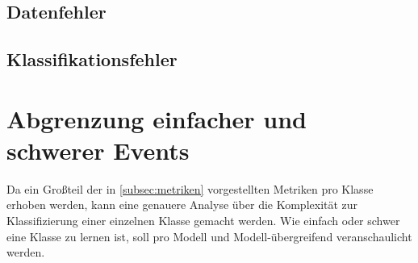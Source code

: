 \subsection{Datenfehler}


\subsection{Klassifikationsfehler}


\section{Abgrenzung einfacher und schwerer Events}
\label{sec:abgrenzung-einfacher-und-schwerer-events}

Da ein Großteil der in \autoref{subsec:metriken} vorgestellten Metriken pro Klasse erhoben werden, kann eine genauere Analyse über die Komplexität zur Klassifizierung einer einzelnen Klasse gemacht werden.
Wie einfach oder schwer eine Klasse zu lernen ist, soll pro Modell und Modell-übergreifend veranschaulicht werden.







